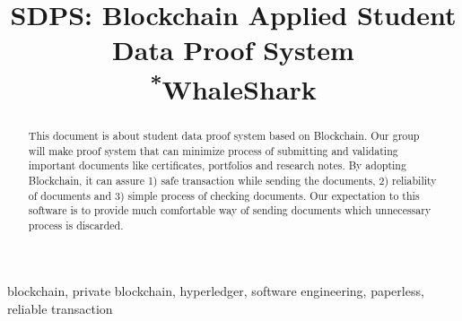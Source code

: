 \documentclass[conference]{IEEEtran}
\begin{document}
\title{SDPS: Blockchain Applied Student Data \linebreak Proof System \\
{\footnotesize \textsuperscript{*}WhaleShark}
}
\author{
\and
{}
\and
{}
\and
{}
}
\maketitle

\begin{abstract}
 This document is about student data proof system based on Blockchain. Our group will make proof system that can minimize process of submitting and validating important documents like certificates, portfolios and research notes. By adopting Blockchain, it can assure 1) safe transaction while sending the documents, 2) reliability of documents and 3) simple process of checking documents. Our expectation to this software is to provide much comfortable way of sending documents which unnecessary process is discarded. \\
\end{abstract}

\begin{IEEEkeywords}
blockchain, private blockchain, hyperledger, software engineering, paperless, reliable transaction
\end{IEEEkeywords}
\end{document}
